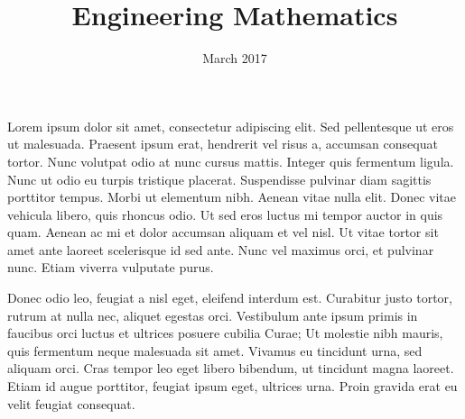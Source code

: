 \documentclass[11pt,a4paper]{uob-leaflet}
\title{Engineering Mathematics}
\date{March 2017}
\begin{document}
\begin{halfcolumn}
  Lorem ipsum dolor sit amet, consectetur adipiscing elit. Sed pellentesque ut
  eros ut malesuada. Praesent ipsum erat, hendrerit vel risus a, accumsan
  consequat tortor. Nunc volutpat odio at nunc cursus mattis. Integer quis
  fermentum ligula. Nunc ut odio eu turpis tristique placerat. Suspendisse
  pulvinar diam sagittis porttitor tempus. Morbi ut elementum nibh. Aenean vitae
  nulla elit. Donec vitae vehicula libero, quis rhoncus odio. Ut sed eros luctus
  mi tempor auctor in quis quam. Aenean ac mi et dolor accumsan aliquam et vel
  nisl. Ut vitae tortor sit amet ante laoreet scelerisque id sed ante. Nunc vel
  maximus orci, et pulvinar nunc. Etiam viverra vulputate purus.

  Donec odio leo, feugiat a nisl eget, eleifend interdum est. Curabitur justo
  tortor, rutrum at nulla nec, aliquet egestas orci. Vestibulum ante ipsum
  primis in faucibus orci luctus et ultrices posuere cubilia Curae; Ut molestie
  nibh mauris, quis fermentum neque malesuada sit amet. Vivamus eu tincidunt
  urna, sed aliquam orci. Cras tempor leo eget libero bibendum, ut tincidunt
  magna laoreet. Etiam id augue porttitor, feugiat ipsum eget, ultrices
  urna. Proin gravida erat eu velit feugiat consequat.
\end{halfcolumn}
\hfill
\begin{halfcolumn}
\end{halfcolumn}
\end{document}
